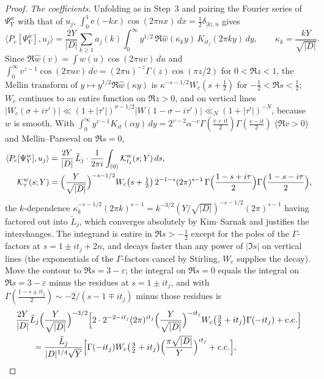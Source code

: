 \documentclass[11pt,a4paper]{article}
\theoremstyle{remark}\newtheorem{remark}[theorem]{Remark}
\newcommand{\e}{\mathrm e}\newcommand{\Off}{\mathrm{Off}}\newcommand{\rep}[2]{\langle #1\rangle_{#2}}
\begin{document}
\begin{proof}
\emph{The coefficients.} Unfolding as in Step~3 and pairing the Fourier series of $\Psi^w_Y$ with that of $u_j$,
$\int_0^1\e(-kx)\cos(2\pi nx)\,dx=\tfrac12\delta_{|k|,n}$ gives
\[
\langle P_e[\Psi^w_Y],u_j\rangle=\frac{2Y}{|D|}\sum_{k\ge1}a_j(k)\int_0^\infty y^{1/2}\,\Re\hat w(\kappa_ky)\,K_{it_j}(2\pi ky)\,dy,\qquad
\kappa_k=\frac{kY}{\sqrt{|D|}} .
\]
Since $\Re\hat w(v)=\int w(u)\cos(2\pi uv)\,du$ and $\int_0^\infty v^{z-1}\cos(2\pi uv)\,dv=(2\pi u)^{-z}\Gamma(z)\cos(\pi z/2)$
for $0<\Re z<1$, the Mellin transform of $y\mapsto y^{1/2}\Re\hat w(\kappa y)$ is $\kappa^{-s-1/2}W_c(s+\tfrac12)$ for
$-\tfrac12<\Re s<\tfrac12$; $W_c$ continues to an entire function on $\Re z>0$, and on vertical lines
$|W_c(\sigma+i\tau')|\ll(1+|\tau'|)^{\sigma-1/2}|W(1-\sigma-i\tau')|\ll_N(1+|\tau'|)^{-N}$, because $w$ is smooth. With
$\int_0^\infty y^{v-1}K_{it}(\alpha y)\,dy=2^{v-2}\alpha^{-v}\Gamma(\tfrac{v+it}2)\Gamma(\tfrac{v-it}2)$ ($\Re v>0$) and Mellin--Parseval
on $\Re s=0$,
\[
\begin{aligned}
\langle P_e[\Psi^w_Y],u_j\rangle&=\frac{2Y}{|D|}\,\tilde L_j\cdot\frac1{2\pi i}\int_{(0)}\mathcal K^w_{t_j}(s;Y)\,ds,\\
\mathcal K^w_{\tau}(s;Y)&=\Bigl(\frac Y{\sqrt{|D|}}\Bigr)^{-s-1/2}W_c\bigl(s+\tfrac12\bigr)\,2^{-1-s}(2\pi)^{s-1}\,
\Gamma\Bigl(\frac{1-s+i\tau}2\Bigr)\Gamma\Bigl(\frac{1-s-i\tau}2\Bigr),
\end{aligned}
\]
the $k$-dependence $\kappa_k^{-s-1/2}(2\pi k)^{s-1}=k^{-3/2}(Y/\sqrt{|D|})^{-s-1/2}(2\pi)^{s-1}$ having factored out into
$\tilde L_j$, which converges absolutely by Kim--Sarnak and justifies the interchanges. The integrand is entire in
$\Re s>-\tfrac12$ except for the poles of the $\Gamma$-factors at $s=1\pm it_j+2n$, and decays faster than any power of
$|\Im s|$ on vertical lines (the exponentials of the $\Gamma$-factors cancel by Stirling, $W_c$ supplies the decay). Move the
contour to $\Re s=3-\varepsilon$; the integral on $\Re s=0$ equals the integral on $\Re s=3-\varepsilon$ minus the residues
at $s=1\pm it_j$, and with $\Gamma(\tfrac{1-s\pm it_j}2)\sim-2/(s-1\mp it_j)$ minus those residues is
\[
\begin{aligned}
&\frac{2Y}{|D|}\tilde L_j\Bigl(\frac Y{\sqrt{|D|}}\Bigr)^{-3/2}\Bigl[2\cdot2^{-2-it_j}(2\pi)^{it_j}\Bigl(\frac Y{\sqrt{|D|}}\Bigr)^{-it_j}W_c\bigl(\tfrac32+it_j\bigr)\Gamma(-it_j)+\text{c.c.}\Bigr]\\
&\qquad=\frac{\tilde L_j}{|D|^{1/4}\sqrt Y}\Bigl[\Gamma(-it_j)W_c\bigl(\tfrac32+it_j\bigr)\Bigl(\frac{\pi\sqrt{|D|}}Y\Bigr)^{it_j}+\text{c.c.}\Bigr],
\end{aligned}
\]
\end{proof}
\end{document}
